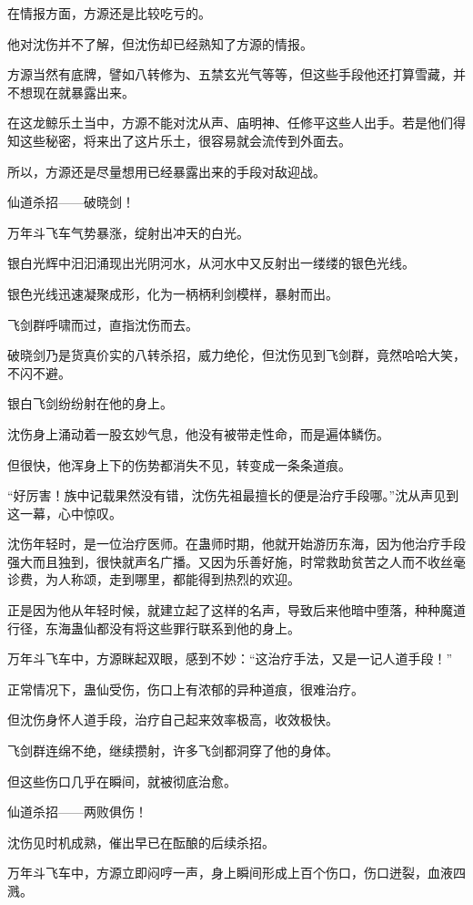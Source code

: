 \begin{this_body}
在情报方面，方源还是比较吃亏的。

他对沈伤并不了解，但沈伤却已经熟知了方源的情报。

方源当然有底牌，譬如八转修为、五禁玄光气等等，但这些手段他还打算雪藏，并不想现在就暴露出来。

在这龙鲸乐土当中，方源不能对沈从声、庙明神、任修平这些人出手。若是他们得知这些秘密，将来出了这片乐土，很容易就会流传到外面去。

所以，方源还是尽量想用已经暴露出来的手段对敌迎战。

仙道杀招——破晓剑！

万年斗飞车气势暴涨，绽射出冲天的白光。

银白光辉中汩汩涌现出光阴河水，从河水中又反射出一缕缕的银色光线。

银色光线迅速凝聚成形，化为一柄柄利剑模样，暴射而出。

飞剑群呼啸而过，直指沈伤而去。

破晓剑乃是货真价实的八转杀招，威力绝伦，但沈伤见到飞剑群，竟然哈哈大笑，不闪不避。

银白飞剑纷纷射在他的身上。

沈伤身上涌动着一股玄妙气息，他没有被带走性命，而是遍体鳞伤。

但很快，他浑身上下的伤势都消失不见，转变成一条条道痕。

“好厉害！族中记载果然没有错，沈伤先祖最擅长的便是治疗手段哪。”沈从声见到这一幕，心中惊叹。

沈伤年轻时，是一位治疗医师。在蛊师时期，他就开始游历东海，因为他治疗手段强大而且独到，很快就声名广播。又因为乐善好施，时常救助贫苦之人而不收丝毫诊费，为人称颂，走到哪里，都能得到热烈的欢迎。

正是因为他从年轻时候，就建立起了这样的名声，导致后来他暗中堕落，种种魔道行径，东海蛊仙都没有将这些罪行联系到他的身上。

万年斗飞车中，方源眯起双眼，感到不妙：“这治疗手法，又是一记人道手段！”

正常情况下，蛊仙受伤，伤口上有浓郁的异种道痕，很难治疗。

但沈伤身怀人道手段，治疗自己起来效率极高，收效极快。

飞剑群连绵不绝，继续攒射，许多飞剑都洞穿了他的身体。

但这些伤口几乎在瞬间，就被彻底治愈。

仙道杀招——两败俱伤！

沈伤见时机成熟，催出早已在酝酿的后续杀招。

万年斗飞车中，方源立即闷哼一声，身上瞬间形成上百个伤口，伤口迸裂，血液四溅。


\end{this_body}
